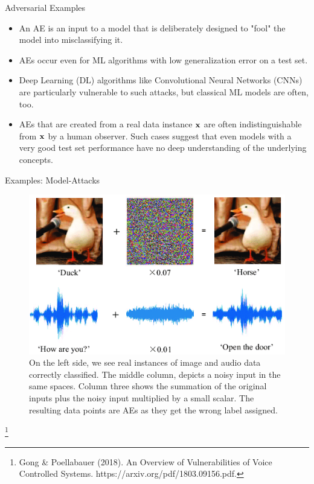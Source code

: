 \documentclass[11pt,compress,t,notes=noshow, aspectratio=169, xcolor=table]{beamer}
\begin{document}
\begin{vbframe}{Adversarial Examples}
\begin{itemize}
\item An AE is an input to a model that is deliberately designed to "fool" the model into misclassifying it.
\item AEs occur even for ML algorithms with low generalization error on a test set.
\item Deep Learning (DL) algorithms like Convolutional Neural Networks (CNNs) are particularly vulnerable to such attacks, but classical ML models are often, too.
\item AEs that are created from a real data instance $\mathbf{x}$ are often indistinguishable from $\mathbf{x}$ by a human observer. Such cases suggest that even models with a very good test set performance have no deep understanding of the underlying concepts.%
\end{itemize}
\end{vbframe}

\begin{vbframe}{Examples: Model-Attacks}
\begin{figure}[h]
\centering
  \includegraphics[width=0.6\linewidth]{figure/AEduckSound.png}
  \caption{On the left side, we see real instances of image and audio data  correctly classified. The middle column, depicts a noisy input in the same spaces. Column three shows the summation of the original inputs plus the noisy input multiplied by a small scalar. The resulting data points are AEs as they get the wrong label assigned.}
  \label{fig:mnist}
\end{figure} 

\footnote[frame]{Gong \& Poellabauer (2018). An Overview of Vulnerabilities of Voice Controlled Systems. https://arxiv.org/pdf/1803.09156.pdf.}


\end{vbframe}
\end{document}
